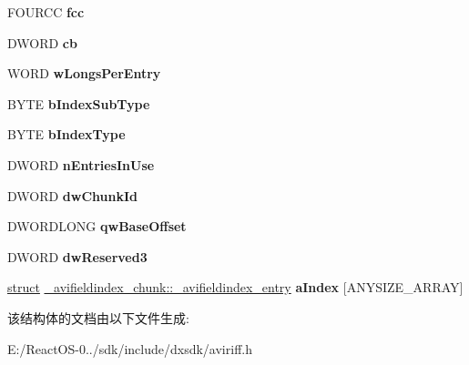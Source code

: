 \begin{DoxyCompactItemize}
\item 
\mbox{\label{struct__avifieldindex__chunk_a5baabee27bc817840953ddbaab96e27b}} 
F\+O\+U\+R\+CC {\bfseries fcc}
\item 
\mbox{\label{struct__avifieldindex__chunk_a251d867133134ba7d79e15a006d61e5c}} 
D\+W\+O\+RD {\bfseries cb}
\item 
\mbox{\label{struct__avifieldindex__chunk_ac16442ba8fc78afbc5dbebf89fa2ba01}} 
W\+O\+RD {\bfseries w\+Longs\+Per\+Entry}
\item 
\mbox{\label{struct__avifieldindex__chunk_a3391e781123a39447dc2bfa5d60979e7}} 
B\+Y\+TE {\bfseries b\+Index\+Sub\+Type}
\item 
\mbox{\label{struct__avifieldindex__chunk_a3d4f9e2a7bfb248098b199232bf8ada2}} 
B\+Y\+TE {\bfseries b\+Index\+Type}
\item 
\mbox{\label{struct__avifieldindex__chunk_a52d5090b20fa5d1c43aed30f7431b22c}} 
D\+W\+O\+RD {\bfseries n\+Entries\+In\+Use}
\item 
\mbox{\label{struct__avifieldindex__chunk_a9ba624dbf5f03948b0f63a28108896bd}} 
D\+W\+O\+RD {\bfseries dw\+Chunk\+Id}
\item 
\mbox{\label{struct__avifieldindex__chunk_a418a706b2542611b00fbdf09e5cfd6d8}} 
D\+W\+O\+R\+D\+L\+O\+NG {\bfseries qw\+Base\+Offset}
\item 
\mbox{\label{struct__avifieldindex__chunk_a1405870395645059ba1600d143d6aa41}} 
D\+W\+O\+RD {\bfseries dw\+Reserved3}
\item 
\mbox{\label{struct__avifieldindex__chunk_aa12aa8f160e6c407bb507758eabe78b7}} 
\hyperlink{interfacestruct}{struct} \hyperlink{struct__avifieldindex__chunk_1_1__avifieldindex__entry}{\+\_\+avifieldindex\+\_\+chunk\+::\+\_\+avifieldindex\+\_\+entry} {\bfseries a\+Index} \mbox{[}A\+N\+Y\+S\+I\+Z\+E\+\_\+\+A\+R\+R\+AY\mbox{]}
\end{DoxyCompactItemize}


该结构体的文档由以下文件生成\+:\begin{DoxyCompactItemize}
\item 
E\+:/\+React\+O\+S-\/0../sdk/include/dxsdk/aviriff.\+h\end{DoxyCompactItemize}
